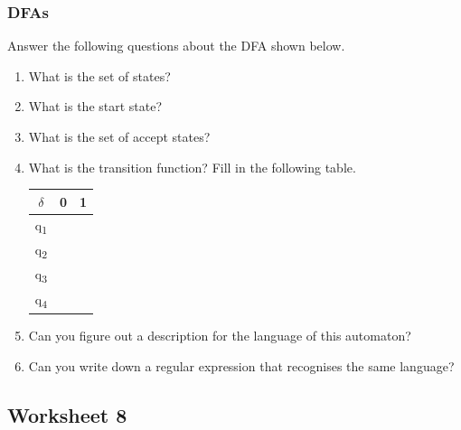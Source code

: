 \documentclass{amsart}
\begin{document}
\subsubsection{DFAs}
\label{sec:org6815627}
Answer the following questions about the DFA shown below.
\begin{center}
\end{center}
\begin{enumerate}
\item What is the set of states?
\item What is the start state?
\item What is the set of accept states?
\item What is the transition function? Fill in the following table.
\begin{center}
\begin{tabular}{|c|c|c|}
\hline
\(\delta\) & 0 & 1\\
\hline
q\textsubscript{1} &  & \\
\hline
q\textsubscript{2} &  & \\
\hline
q\textsubscript{3} &  & \\
\hline
q\textsubscript{4} &  & \\
\hline
\end{tabular}
\end{center}
\item Can you figure out a description for the language of this automaton?
\item Can you write down a regular expression that recognises the same language?
\end{enumerate}
\subsection{Worksheet 8}
\label{sec:org95680b2}
\togglefalse{solutions}
\end{document}

